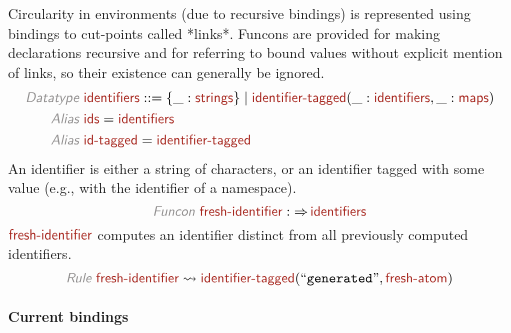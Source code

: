 \documentclass[fleqn]{article}
\newcommand{\KEY}[1]{\textsf{\textit{\color{Gray}#1}}}
\newcommand{\STRING}[1]{\text{``\texttt{#1}''}}
\newcommand{\NAME}[2][\PLAIN]{#1{Name_#2}{\textsf{\color{Mahogany}#2}}}
\newcommand{\PLAIN}[1]{}
\newcommand{\TO}{\mathop{\Rightarrow}}
\begin{document}
Circularity in environments (due to recursive bindings) is represented using
bindings to cut-points called *links*. Funcons are provided for making
declarations recursive and for referring to bound values without explicit
mention of links, so their existence can generally be ignored.
% 
\begin{align*}
  \KEY{Datatype} ~
  & \NAME{identifiers} ::= \{\_:\NAME{strings}\} \mid \NAME{identifier-tagged}(\_:\NAME{identifiers}, \_:\NAME{maps})
\\
  \KEY{Alias} ~
  & \NAME{ids} = \NAME{identifiers}
\\
  \KEY{Alias} ~
  & \NAME{id-tagged} = \NAME{identifier-tagged}
\end{align*}
% 
An identifier is either a string of characters, or an identifier tagged with
some value (e.g., with the identifier of a namespace).
% 
\[ %
\KEY{Funcon} ~
  \NAME{fresh-identifier} : \TO \NAME{identifiers}
\] %
% 
$ \NAME{fresh-identifier} $ computes an identifier distinct from all previously
computed identifiers.
% 
\[ %
\KEY{Rule} ~
  \NAME{fresh-identifier} \leadsto \NAME{identifier-tagged}(\STRING{generated}, \NAME{fresh-atom})
\] %

\paragraph*{Current bindings}
\end{document}
